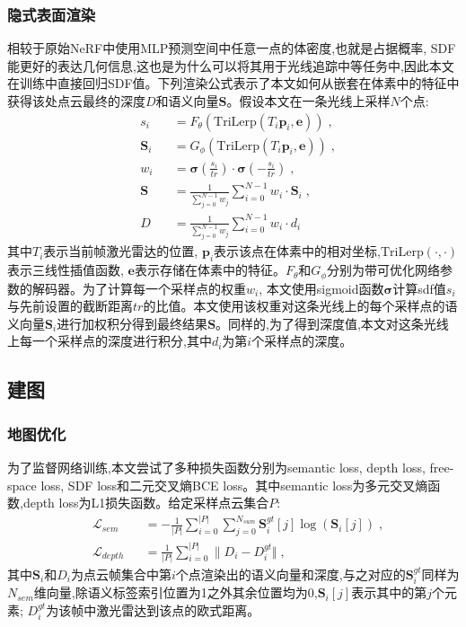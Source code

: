 \subsubsection{隐式表面渲染}
相较于原始NeRF中使用MLP预测空间中任意一点的体密度,也就是占据概率, SDF能更好的表达几何信息,这也是为什么可以将其用于光线追踪中等任务中,因此本文在训练中直接回归SDF值。下列渲染公式表示了本文如何从嵌套在体素中的特征中获得该处点云最终的深度$D$和语义向量$\mathbf{S}$。假设本文在一条光线上采样$N$个点:
\begin{equation}
\begin{alignedat}{2}
    &s_i&&=F_\theta(\mbox{TriLerp}(T_i\mathbf{p}_i,\mathbf{e}))\;,\\
    &\mathbf{S}_i&&=G_\phi(\mbox{TriLerp}(T_i\mathbf{p}_i,\mathbf{e}))\;,\\
    &w_i&&=\mathbf{\sigma}(\frac{s_i}{tr})\cdot\mathbf{\sigma}(-\frac{s_i}{tr})\;,\\
    &\mathbf{S} &&= \frac{1}{\sum_{j=0}^{N-1}w_j}\sum_{i=0}^{N-1}w_i\cdot\mathbf{S}_i\;,\\
    &D &&= \frac{1}{\sum_{j=0}^{N-1}w_j}\sum_{i=0}^{N-1}w_i\cdot d_i
\end{alignedat}
\end{equation}
其中$T_i$表示当前帧激光雷达的位置, $\mathbf{p}_i$表示该点在体素中的相对坐标,$\mbox{TriLerp}(\cdot , \cdot)$表示三线性插值函数, $\mathbf{e}$表示存储在体素中的特征。$F_\theta\mbox{和}G_\phi$分别为带可优化网络参数的解码器。为了计算每一个采样点的权重$w_i$, 本文使用sigmoid函数$\mathbf{\sigma}$计算sdf值$s_i$与先前设置的截断距离$tr$的比值。本文使用该权重对这条光线上的每个采样点的语义向量$\mathbf{S}_i$进行加权积分得到最终结果$\mathbf{S}$。同样的,为了得到深度值,本文对这条光线上每一个采样点的深度进行积分,其中$d_i$为第$i$个采样点的深度。
\subsection{建图}
\subsubsection{地图优化}
为了监督网络训练,本文尝试了多种损失函数分别为semantic loss, depth loss, free-space loss, SDF loss和二元交叉熵BCE loss。其中semantic loss为多元交叉熵函数,depth loss为L1损失函数。给定采样点云集合$P$:
\begin{equation}
\begin{alignedat}{2}
    &\mathcal{L}_{sem} &&= -\frac{1}{|P|}\sum_{i=0}^{|P|}\sum_{j=0}^{N_{sum}}\mathbf{S}_i^{gt}[j]\log(\mathbf{S}_i[j])\;,\\
    &\mathcal{L}_{depth} &&= \frac{1}{|P|}\sum_{i=0}^{|P|}\| D_i-D_i^{gt}\Vert\;,
\end{alignedat}
\end{equation}
其中$\mathbf{S}_i$和$D_i$为点云帧集合中第$i$个点渲染出的语义向量和深度,与之对应的$\mathbf{S}_i^{gt}$同样为$N_{sem}$维向量,除语义标签索引位置为1之外其余位置均为0,$\mathbf{S}_i[j]$表示其中的第$j$个元素; $D_i^{gt}$为该帧中激光雷达到该点的欧式距离。 

